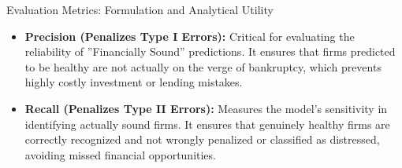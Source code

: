 \documentclass[8pt, aspectratio=169]{beamer}
\begin{document}
\begin{frame}{Evaluation Metrics: Formulation and Analytical Utility}
    \begin{table}
        \centering
    \end{table}
    
  \begin{itemize}
        \item \textbf{Precision (Penalizes Type I Errors):} Critical for evaluating the reliability of ''Financially Sound'' predictions. It ensures that firms predicted to be healthy are not actually on the verge of bankruptcy, which prevents highly costly investment or lending mistakes.
        
        \item \textbf{Recall (Penalizes Type II Errors):} Measures the model's sensitivity in identifying actually sound firms. It ensures that genuinely healthy firms are correctly recognized and not wrongly penalized or classified as distressed, avoiding missed financial opportunities.
    \end{itemize}
\end{frame}
\end{document}
